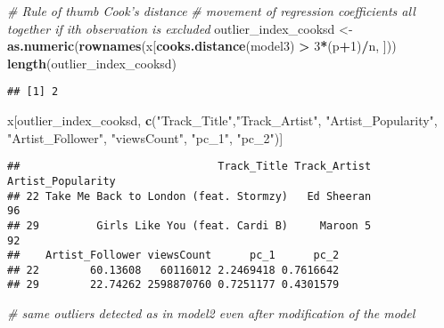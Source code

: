 \documentclass[
]{article}
\newenvironment{Shaded}{\begin{snugshade}}{\end{snugshade}}
\newcommand{\CommentTok}[1]{\textcolor[rgb]{0.56,0.35,0.01}{\textit{#1}}}
\newcommand{\DecValTok}[1]{\textcolor[rgb]{0.00,0.00,0.81}{#1}}
\newcommand{\KeywordTok}[1]{\textcolor[rgb]{0.13,0.29,0.53}{\textbf{#1}}}
\newcommand{\NormalTok}[1]{#1}
\newcommand{\OperatorTok}[1]{\textcolor[rgb]{0.81,0.36,0.00}{\textbf{#1}}}
\newcommand{\StringTok}[1]{\textcolor[rgb]{0.31,0.60,0.02}{#1}}
\begin{document}
\begin{Shaded}
\begin{Highlighting}[]
\CommentTok{# Rule of thumb Cook's distance}
\CommentTok{# movement of regression coefficients all together if ith observation is excluded}
\NormalTok{outlier_index_cooksd <-}\StringTok{ }\KeywordTok{as.numeric}\NormalTok{(}\KeywordTok{rownames}\NormalTok{(x[}\KeywordTok{cooks.distance}\NormalTok{(model3) }\OperatorTok{>}\StringTok{ }\DecValTok{3}\OperatorTok{*}\NormalTok{(p}\OperatorTok{+}\DecValTok{1}\NormalTok{)}\OperatorTok{/}\NormalTok{n, ]))}
\KeywordTok{length}\NormalTok{(outlier_index_cooksd)}
\end{Highlighting}
\end{Shaded}

\begin{verbatim}
## [1] 2
\end{verbatim}

\begin{Shaded}
\begin{Highlighting}[]
\NormalTok{x[outlier_index_cooksd, }\KeywordTok{c}\NormalTok{(}\StringTok{"Track_Title"}\NormalTok{,}\StringTok{"Track_Artist"}\NormalTok{, }\StringTok{"Artist_Popularity"}\NormalTok{, }\StringTok{"Artist_Follower"}\NormalTok{, }\StringTok{"viewsCount"}\NormalTok{, }\StringTok{"pc_1"}\NormalTok{,}
                            \StringTok{"pc_2"}\NormalTok{)]}
\end{Highlighting}
\end{Shaded}

\begin{verbatim}
##                               Track_Title Track_Artist Artist_Popularity
## 22 Take Me Back to London (feat. Stormzy)   Ed Sheeran                96
## 29         Girls Like You (feat. Cardi B)     Maroon 5                92
##    Artist_Follower viewsCount      pc_1      pc_2
## 22        60.13608   60116012 2.2469418 0.7616642
## 29        22.74262 2598870760 0.7251177 0.4301579
\end{verbatim}

\begin{Shaded}
\begin{Highlighting}[]
\CommentTok{# same outliers detected as in model2 even after modification of the model}
\end{Highlighting}
\end{Shaded}
\end{document}
